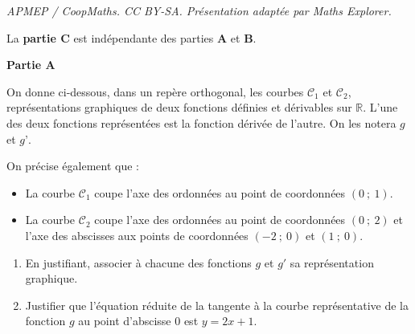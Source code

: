 \documentclass[10pt]{article}
\providecommand{\R}{\mathbb{R}}
\begin{document}
\noindent\textit{APMEP / CoopMaths. CC BY-SA. Présentation adaptée par Maths Explorer.}\par\medskip
\medskip

La \textbf{partie C} est indépendante des parties \textbf{A} et \textbf{B}.

\medskip

\textbf{Partie A}

\medskip

On donne ci-dessous, dans un repère orthogonal, les courbes $\mathcal{C}_{1}$ et $\mathcal{C}_{2}$, représentations graphiques de deux fonctions définies et dérivables sur $\R$. L'une des deux fonctions représentées est la fonction dérivée de l'autre. On les notera $g$ et $g’$.

On précise également que :
\begin{itemize}
\item La courbe $\mathcal{C}_{1}$ coupe l'axe des ordonnées au point de coordonnées $(0~;~1)$.
\item La courbe $\mathcal{C}_{2}$ coupe l'axe des ordonnées au point de coordonnées $(0~;~2)$ et l'axe des abscisses aux points de coordonnées $(-2~;~0)$ et $(1~;~0)$.
\end{itemize}

\begin{center}
















\end{center}

\begin{enumerate}
	\item En justifiant, associer à chacune des fonctions $g$ et $g'$ sa représentation graphique.
	\item Justifier que l'équation réduite de la tangente à la
courbe représentative de la fonction $g$ au point d'abscisse 0 est $y=2x + 1$.
\end{enumerate}
\end{document}
